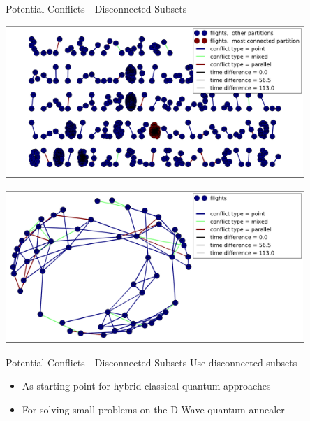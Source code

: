 \documentclass[10pt]{beamer}
\begin{document}
\begin{frame}[t]{Potential Conflicts - Disconnected Subsets}
     {
        \begin{center}
            \includegraphics[width=0.85\textwidth]{images/conflicts_graph_new.pdf}
        \end{center}
    }
     {
        \begin{center}
            \includegraphics[width=0.85\textwidth]{images/conflicts_graph_zoom_new.pdf}
        \end{center}
    }
\end{frame}
\begin{frame}[t]{Potential Conflicts - Disconnected Subsets}
    Use disconnected subsets
    \begin{itemize}
        \item As starting point for hybrid classical-quantum approaches
        \item For solving small problems on the D-Wave quantum annealer
    \end{itemize}
\end{frame}
\end{document}

